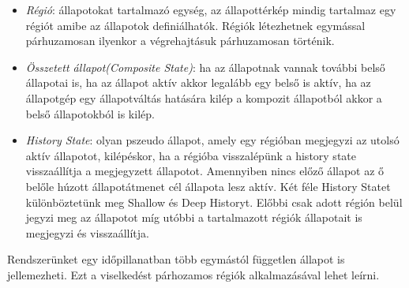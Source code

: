 \begin{itemize}	
	\item \emph{Régió}: állapotokat tartalmazó egység, az állapottérkép mindig tartalmaz egy régiót amibe az állapotok definiálhatók. Régiók létezhetnek egymással párhuzamosan ilyenkor a végrehajtásuk párhuzamosan történik.
	\item \emph{Összetett állapot(Composite State)}: ha az állapotnak vannak további belső állapotai is, ha az állapot aktív akkor legalább egy belső is aktív, ha az állapotgép egy állapotváltás hatására kilép a kompozit állapotból akkor a belső állapotokból is kilép.
	\item \emph{History State}: olyan pszeudo állapot, amely egy régióban megjegyzi az utolsó aktív állapotot, kilépéskor, ha a régióba visszalépünk a history state visszaállítja a megjegyzett állapotot. Amennyiben nincs előző állapot az ő belőle húzott állapotátmenet cél állapota lesz aktív. Két féle History Statet különböztetünk meg Shallow és Deep Historyt. Előbbi csak adott régión belül jegyzi meg az állapotot míg utóbbi a tartalmazott régiók állapotait is megjegyzi és visszaállítja.
	
\end{itemize}
Rendszerünket egy időpillanatban több egymástól független állapot is jellemezheti. Ezt a viselkedést párhozamos régiók alkalmazásával lehet leírni.
